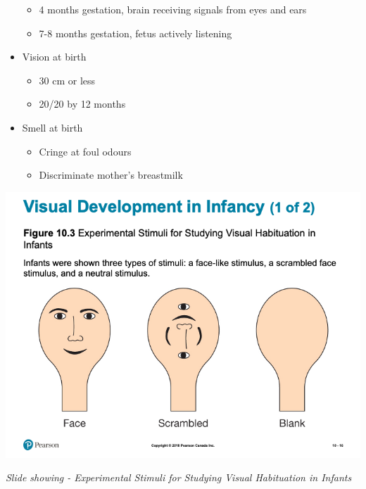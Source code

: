 \documentclass[
]{book}
\providecommand{\tightlist}{%
  \setlength{\itemsep}{0pt}\setlength{\parskip}{0pt}}
\begin{document}
\begin{reflect}
\begin{itemize}
  \begin{itemize}
  \tightlist
  \item
    4 months gestation, brain receiving signals from eyes and ears\\
  \item
    7-8 months gestation, fetus actively listening\\
  \end{itemize}
\item
  Vision at birth

  \begin{itemize}
  \tightlist
  \item
    30 cm or less\\
  \item
    20/20 by 12 months\\
  \end{itemize}
\item
  Smell at birth

  \begin{itemize}
  \tightlist
  \item
    Cringe at foul odours\\
  \item
    Discriminate mother's breastmilk
  \end{itemize}
\end{itemize}

\includegraphics{assets/unit_3/slide_16.png}

\emph{Slide showing - Experimental Stimuli for Studying Visual Habituation in Infants}


\end{reflect}
\end{document}
